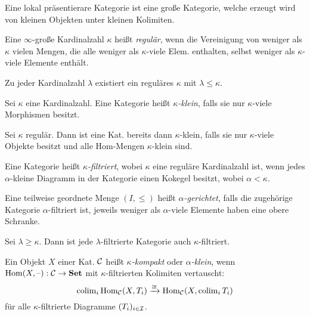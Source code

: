 \documentclass{cheat-sheet}
\begin{document}
\begin{motto}
  Eine lokal präsentierare Kategorie ist eine große Kategorie, welche erzeugt wird von kleinen Objekten unter kleinen Kolimiten.
\end{motto}

\begin{defn}
  Eine $\infty$-große Kardinalzahl $\kappa$ heißt \emph{regulär}, wenn die Vereinigung von weniger als $\kappa$ vielen Mengen, die alle weniger als $\kappa$-viele Elem. enthalten, selbst weniger als $\kappa$-viele Elemente enthält.
\end{defn}

\begin{bem}
  Zu jeder Kardinalzahl $\lambda$ existiert ein reguläres $\kappa$ mit $\lambda \leq \kappa$.
\end{bem}

\begin{defn}
  Sei $\kappa$ eine Kardinalzahl. Eine Kategorie heißt \emph{$\kappa$-klein}, falls sie nur $\kappa$-viele Morphismen besitzt.
\end{defn}

\begin{bem}
  Sei $\kappa$ regulär. Dann ist eine Kat. bereits dann $\kappa$-klein, falls sie nur $\kappa$-viele Objekte besitzt und alle Hom-Mengen $\kappa$-klein sind.
\end{bem}

\begin{defn}
  Eine Kategorie heißt \emph{$\kappa$-filtriert}, wobei $\kappa$ eine reguläre Kardinalzahl ist, wenn jedes $\alpha$-kleine Diagramm in der Kategorie einen Kokegel besitzt, wobei $\alpha < \kappa$.
\end{defn}

\begin{defn}
  Eine teilweise geordnete Menge $(I, \leq)$ heißt \emph{$\alpha$-gerichtet}, falls die zugehörige Kategorie $\alpha$-filtriert ist, \dh{} jeweils weniger als $\alpha$-viele Elemente haben eine obere Schranke.
\end{defn}

\begin{bem}
  Sei $\lambda \geq \kappa$. Dann ist jede $\lambda$-filtrierte Kategorie auch $\kappa$-filtriert.
\end{bem}

\begin{defn}
  Ein Objekt $X$ einer Kat. $\mathcal{C}$ heißt \emph{$\kappa$-kompakt} oder \emph{$\alpha$-klein}, wenn $\operatorname{Hom}(X, \text{--}) : \mathcal{C} \to \mathbf{Set}$ mit $\kappa$-filtrierten Kolimiten vertauscht:
  \[
    \operatorname{colim}_i \operatorname{Hom}_{\mathcal{C}}(X, T_i) \xrightarrow{\cong} \operatorname{Hom}_{\mathcal{C}}(X, \operatorname{colim}_i T_i)
  \]
  für alle $\kappa$-filtrierte Diagramme $(T_i)_{i \in \mathcal{I}}$.
\end{defn}
\end{document}
